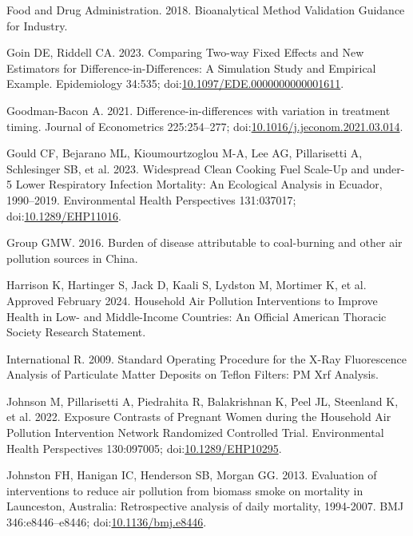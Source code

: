 \documentclass[
  letterpaper,
  DIV=11,
  numbers=noendperiod]{scrartcl}
\newlength{\cslhangindent}
\newlength{\cslentryspacingunit} %
\newenvironment{CSLReferences}[2] %
 {%
  \setlength{\parindent}{0pt}
  \ifodd #1
  \let\oldpar\par
  \def\par{\hangindent=\cslhangindent\oldpar}
  \fi
  \setlength{\parskip}{#2\cslentryspacingunit}
 }%
 {}
\begin{document}
\begin{CSLReferences}{1}{0}
\leavevmode{}%
Food and Drug Administration. 2018. Bioanalytical {Method Validation
Guidance} for {Industry}.

\leavevmode{}%
Goin DE, Riddell CA. 2023. Comparing {Two-way Fixed Effects} and {New
Estimators} for {Difference-in-Differences}: {A Simulation Study} and
{Empirical Example}. Epidemiology 34:535;
doi:\href{https://doi.org/10.1097/EDE.0000000000001611}{10.1097/EDE.0000000000001611}.

\leavevmode{}%
Goodman-Bacon A. 2021. Difference-in-differences with variation in
treatment timing. Journal of Econometrics 225:254--277;
doi:\href{https://doi.org/10.1016/j.jeconom.2021.03.014}{10.1016/j.jeconom.2021.03.014}.

\leavevmode{}%
Gould CF, Bejarano ML, Kioumourtzoglou M-A, Lee AG, Pillarisetti A,
Schlesinger SB, et al. 2023. Widespread {Clean Cooking Fuel Scale-Up}
and under-5 {Lower Respiratory Infection Mortality}: {An Ecological
Analysis} in {Ecuador}, 1990--2019. Environmental Health Perspectives
131:037017;
doi:\href{https://doi.org/10.1289/EHP11016}{10.1289/EHP11016}.

\leavevmode{}%
Group GMW. 2016. Burden of disease attributable to coal-burning and
other air pollution sources in {China}.

\leavevmode{}%
Harrison K, Hartinger S, Jack D, Kaali S, Lydston M, Mortimer K, et al.
Approved February 2024. Household {Air Pollution Interventions} to
{Improve Health} in {Low-} and {Middle-Income Countries}: {An Official
American Thoracic Society Research Statement}.

\leavevmode{}%
International R. 2009. Standard {Operating Procedure} for the {X-Ray
Fluorescence Analysis} of {Particulate Matter Deposits} on {Teflon
Filters}: {PM Xrf Analysis}.

\leavevmode{}%
Johnson M, Pillarisetti A, Piedrahita R, Balakrishnan K, Peel JL,
Steenland K, et al. 2022. Exposure {Contrasts} of {Pregnant Women}
during the {Household Air Pollution Intervention Network Randomized
Controlled Trial}. Environmental Health Perspectives 130:097005;
doi:\href{https://doi.org/10.1289/EHP10295}{10.1289/EHP10295}.

\leavevmode{}%
Johnston FH, Hanigan IC, Henderson SB, Morgan GG. 2013. Evaluation of
interventions to reduce air pollution from biomass smoke on mortality in
{Launceston}, {Australia}: Retrospective analysis of daily mortality,
1994-2007. BMJ 346:e8446--e8446;
doi:\href{https://doi.org/10.1136/bmj.e8446}{10.1136/bmj.e8446}.


\end{CSLReferences}
\end{document}
